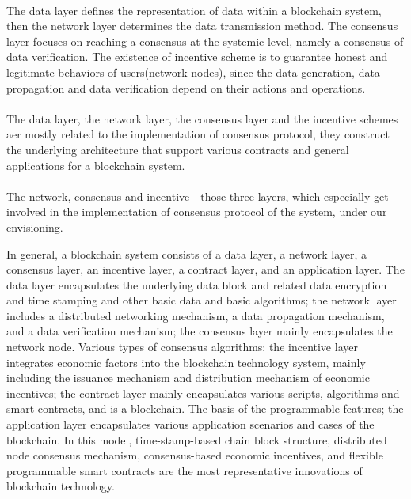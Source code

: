 \documentclass[]{article}
\begin{document}
\begin{CJK*}{UTF8}{gbsn}
\paragraph{} The data layer defines the representation of data within a blockchain system, then the network layer determines the data transmission method. The consensus layer focuses on reaching a consensus at the systemic level, namely a consensus of data verification. The existence of incentive scheme is to guarantee honest and legitimate behaviors of users(network nodes), since the data generation, data propagation and data verification depend on their actions and operations. 
\paragraph{} The data layer, the network layer, the consensus layer and the incentive schemes aer mostly related to the implementation of consensus protocol, they construct the underlying architecture that support various contracts and general applications for a blockchain system.
\paragraph{}	
	The network, consensus and incentive - those three layers, which especially get involved in the implementation of consensus protocol of the system, under our envisioning. 


In general, a blockchain system consists of a data layer, a network layer, a consensus layer, an incentive layer, a contract layer, and an application layer. The data layer encapsulates the underlying data block and related data encryption and time stamping and other basic data and basic algorithms; the network layer includes a distributed networking mechanism, a data propagation mechanism, and a data verification mechanism; the consensus layer mainly encapsulates the network node. Various types of consensus algorithms; the incentive layer integrates economic factors into the blockchain technology system, mainly including the issuance mechanism and distribution mechanism of economic incentives; the contract layer mainly encapsulates various scripts, algorithms and smart contracts, and is a blockchain. The basis of the programmable features; the application layer encapsulates various application scenarios and cases of the blockchain. In this model, time-stamp-based chain block structure, distributed node consensus mechanism, consensus-based economic incentives, and flexible programmable smart contracts are the most representative innovations of blockchain technology.


\end{CJK*}
\end{document}

